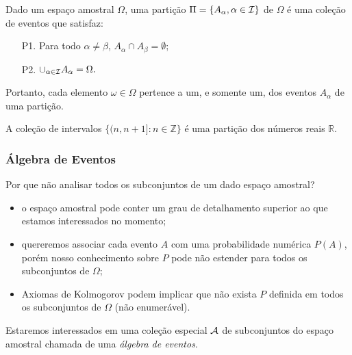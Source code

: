 %
\begin{frame}
 \begin{defi}[Partição] Dado um espaço amostral $\Omega$, uma partição
$\Pi=\{A_{\alpha},\alpha\in{\cal I}\}$ de $\Omega$ é uma coleção de
eventos que satisfaz:
\begin{enumerate}
\item[P1.] Para todo $\alpha\neq\beta$, $A_{\alpha}\cap
A_{\beta}=\emptyset$;
%
\item[P2.] $\cup_{\alpha\in{\cal I}}A_{\alpha}=\Omega.$
\end{enumerate}
\end{defi}
%

Portanto, cada elemento
$\omega\in\Omega$ pertence a um, e somente um, dos eventos
$A_{\alpha}$ de uma partição.

\begin{exem}
	A coleção de intervalos $\{(n,n+1]:n \in \mathbb{Z} \}$ é uma partição dos
números reais $\mathbb{R}$. 
\end{exem}

\end{frame}
%
%
\begin{frame}
\frametitle{\textbf{Álgebra de Eventos}}
\baselineskip=13pt
\begin{block}{}


Por que não analisar todos os subconjuntos de um dado espaço amostral?
\begin{itemize}
\item o espaço amostral pode conter um grau de
detalhamento superior ao que estamos interessados no momento;

\item quereremos associar cada
evento $A$ com uma probabilidade numérica $P(A)$, porém nosso conhecimento sobre $P$ pode não
estender para todos os subconjuntos de $\Omega$;

\item Axiomas de Kolmogorov podem implicar que não exista $P$ definida em
todos os subconjuntos de $\Omega$ (não enumerável).
\end{itemize}

Estaremos interessados em uma coleção especial ${\cal A}$ de subconjuntos do espaço amostral
chamada de uma {\em álgebra de eventos}.

\end{block}
\end{frame}
